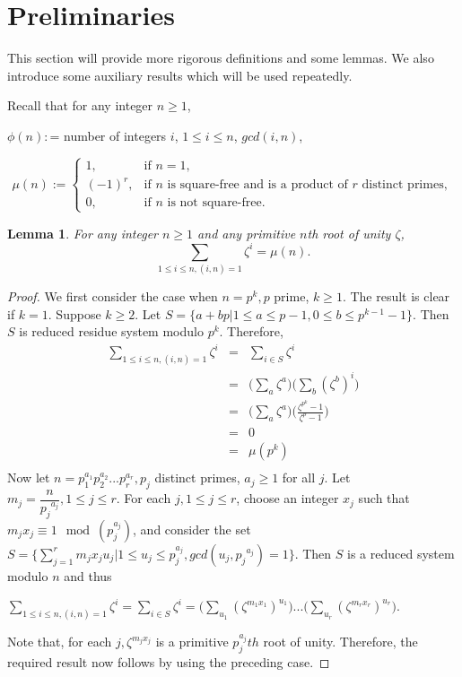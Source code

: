 \documentclass[12pt, reqno]{amsart}
\numberwithin{equation}{section}
\theoremstyle{definition}
\theoremstyle{remark}
\theoremstyle{plain}
\newtheorem{lemma}[definition]{Lemma}
\begin{document}
\section{Preliminaries}
This section will provide more rigorous definitions and some lemmas. We also introduce some auxiliary results which will be used repeatedly.\smallskip

Recall that for any integer $n\geq1$,\smallskip

$\phi(n):$= number of integers $i$, $1\leq i \leq n$, $gcd(i,n)$,

\[
\mu(n) :=
\begin{cases}
1, & \text{if } n = 1,\\
(-1)^r, & \text{if $n$ is square-free and is a product of $r$ distinct primes},\\
0, & \text{if $n$ is not square-free}.
\end{cases}
 \]
\begin{lemma}\cite[Lemma 1]{Bakshi} \label{L: root} For any integer $n\geq1$ and any primitive $n$th root of unity $\zeta$,
\begin{equation}\nonumber
  \sum_{1 \leq i \leq n, (i,n)=1}\zeta^{i} =\mu(n). 
\end{equation}
\end{lemma}
\begin{proof} 
We first consider the case when $n=p^k, p$ prime, $k\geq1$. The result is clear if $k=1$. Suppose $k\geq2$. Let $S= \{a+b p|1\leq a\leq p-1, 0\leq b\leq p^{k-1}-1\}$. Then $S$ is reduced residue system modulo $p^k$. Therefore, 
 \begin{eqnarray}\nonumber
    \sum_{1 \leq i \leq n, (i,n)=1}\zeta^{i}&=& \sum_{i\in S}\zeta^{i} \\\nonumber
    &=& \bigg(\sum_{a}\zeta^{a}\bigg)\bigg(\sum_{b}(\zeta^b)^{i}\bigg) \\\nonumber
   &=& \bigg(\sum_{a}\zeta^{a}\bigg)\bigg(\frac{\zeta^{p^{k}}-1}{\zeta^p-1}\bigg) \\\nonumber
    &=& 0 \\\nonumber
    &=& \mu(p^k)\\\nonumber
 \end{eqnarray}
 Now let $n=p^{a_1}_1p^{a_2}_2...p^{a_r}_r, p_j$ distinct primes, $a_j\geq1$ for all $j$. Let $m_j=\dfrac{n}{{p_j}^{a_j}}, 1\leq j\leq r$. For each $j, 1\leq j\leq r$, choose an integer $x_j$ such that $m_jx_j\equiv 1 \mod (p^{a_j}_j)$, and consider the set $S= \{\sum_{j=1}^{r}m_jx_ju_j|1\leq u_j\leq p^{a_j}_j, gcd(u_j, {p_j}^{a_j})=1\}$. Then $S$ is a reduced system modulo $n$ and thus            
 \begin{center}
 $\sum_{1 \leq i \leq n, (i,n)=1}\zeta^{i}=\sum_{i\in S}\zeta^{i}=\bigg(\sum_{u_1}(\zeta^{m_1x_1})^{u_1}\bigg)...\bigg(\sum_{u_r}(\zeta^{m_rx_r})^{u_r}\bigg)$.
 \end{center}
Note that, for each $j, \zeta^{m_jx_j}$ is a primitive $p^{a_j}_jth$ root of unity. Therefore, the required result now follows by using the preceding case.
\end{proof}\smallskip
\end{document}
